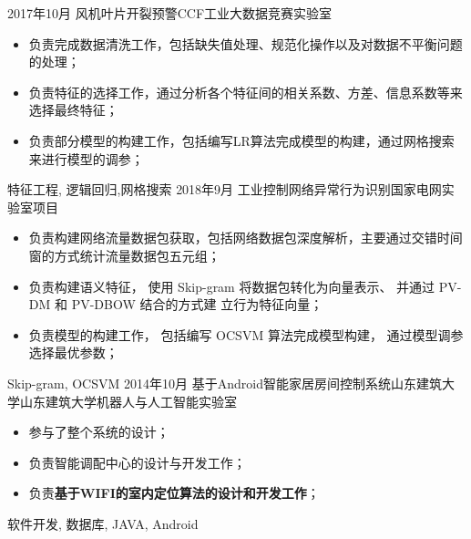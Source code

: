 \begin{experiences}
  \experience
  {2017年10月} {风机叶片开裂预警}{CCF工业大数据竞赛}{实验室}
  {}    {
				  	\begin{itemize}
				  		\item  负责完成数据清洗工作，包括缺失值处理、规范化操作以及对数据不平衡问题的处理；
				  		\item  负责特征的选择工作，通过分析各个特征间的相关系数、方差、信息系数等来选择最终特征；
                        \item  负责部分模型的构建工作，包括编写LR算法完成模型的构建，通过网格搜索来进行模型的调参；
				  	\end{itemize}
				  }
				  {特征工程, 逻辑回归,网格搜索}
  \emptySeparator
  \experience
  {2018年9月} {工业控制网络异常行为识别}{国家电网}{实验室项目}
  {}    {
    \begin{itemize}
      \item 负责构建网络流量数据包获取，包括网络数据包深度解析，主要通过交错时间窗的方式统计流量数据包五元组；
      \item  负责构建语义特征， 使用 Skip-gram 将数据包转化为向量表示、 并通过 PV-DM 和 PV-DBOW 结合的方式建
  立行为特征向量；
  \item 负责模型的构建工作， 包括编写 OCSVM 算法完成模型构建， 通过模型调参选择最优参数；
    \end{itemize}
  }
  {Skip-gram, OCSVM}
  \emptySeparator
  \experience
  {2014年10月} {基于Android智能家居房间控制系统}{山东建筑大学}{山东建筑大学机器人与人工智能实验室}
  {}    {
				  	\begin{itemize}
				  		\item 参与了整个系统的设计；
				  		\item 负责智能调配中心的设计与开发工作；
                        \item 负责\textbf{基于WIFI的室内定位算法的设计和开发工作}；
				  	\end{itemize}
				  }
				  {软件开发, 数据库, JAVA, Android}

 \emptySeparator
\end{experiences}
